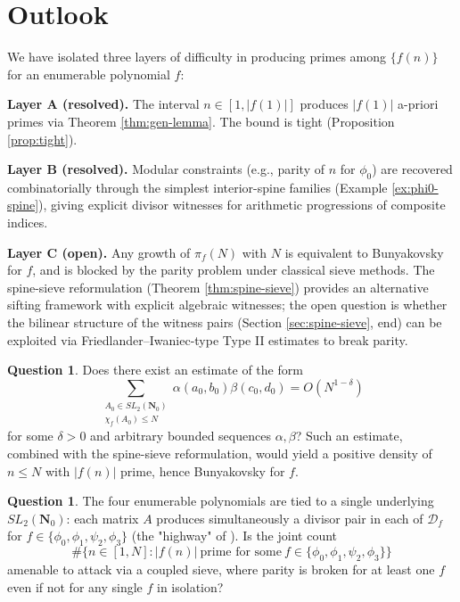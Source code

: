 \documentclass[11pt]{article}
\theoremstyle{definition}
\newtheorem{question}[theorem]{Question}
\newcommand{\Nz}{\mathbf{N}_0}
\newcommand{\SLNz}{SL_2(\Nz)}
\newcommand{\Df}{\mathcal{D}_f}
\begin{document}
\section{Outlook}\label{sec:outlook}

We have isolated three layers of difficulty in producing primes among $\{f(n)\}$ for an enumerable polynomial $f$:

\textbf{Layer A (resolved).} The interval $n \in [1,|f(1)|]$ produces $|f(1)|$ a-priori primes via Theorem \ref{thm:gen-lemma}. The bound is tight (Proposition \ref{prop:tight}).

\textbf{Layer B (resolved).} Modular constraints (e.g., parity of $n$ for $\phi_0$) are recovered combinatorially through the simplest interior-spine families (Example \ref{ex:phi0-spine}), giving explicit divisor witnesses for arithmetic progressions of composite indices.

\textbf{Layer C (open).} Any growth of $\pi_f(N)$ with $N$ is equivalent to Bunyakovsky for $f$, and is blocked by the parity problem under classical sieve methods. The spine-sieve reformulation (Theorem \ref{thm:spine-sieve}) provides an alternative sifting framework with explicit algebraic witnesses; the open question is whether the bilinear structure of the witness pairs (Section \ref{sec:spine-sieve}, end) can be exploited via Friedlander–Iwaniec-type Type II estimates to break parity.

\begin{question}\label{q:bilinear}
Does there exist an estimate of the form
\[
\sum_{\substack{A_0 \in \SLNz \\ \chi_f(A_0) \le N}} \alpha(a_0,b_0) \beta(c_0,d_0) = O\!\left(N^{1-\delta}\right)
\]
for some $\delta > 0$ and arbitrary bounded sequences $\alpha,\beta$? Such an estimate, combined with the spine-sieve reformulation, would yield a positive density of $n \le N$ with $|f(n)|$ prime, hence Bunyakovsky for $f$.
\end{question}

\begin{question}\label{q:joint-density}
The four enumerable polynomials are tied to a single underlying $\SLNz$: each matrix $A$ produces simultaneously a divisor pair in each of $\Df$ for $f \in \{\phi_0,\phi_1,\psi_2,\phi_3\}$ (the "highway" of \cite[Sec.~3]{shakov}). Is the joint count
\[
\#\{n \in [1,N] : |f(n)|\ \text{prime for some}\ f \in \{\phi_0,\phi_1,\psi_2,\phi_3\}\}
\]
amenable to attack via a coupled sieve, where parity is broken for at least one $f$ even if not for any single $f$ in isolation?
\end{question}
\end{document}
